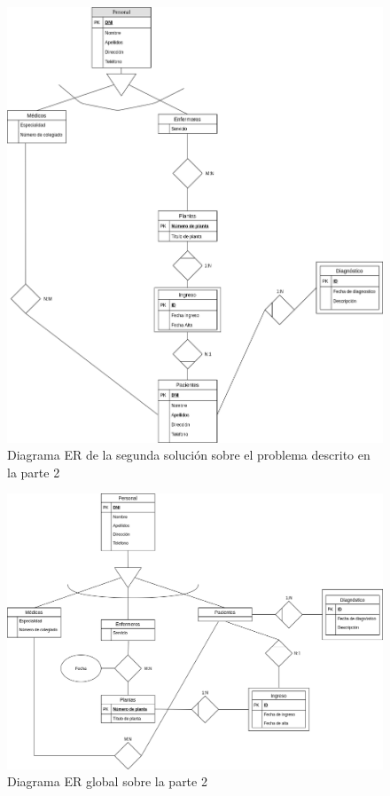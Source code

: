 \documentclass{article}
\begin{document}
\begin{figure}
\centering
\includegraphics[scale=0.5]{images/er_parte2_2.png}
\caption{Diagrama ER de la segunda solución sobre el problema descrito en la parte 2}
\label{fig:er_parte2_2}
\end{figure}

\begin{landscape}
\begin{figure}
\centering
\includegraphics[scale=0.45]{images/global_parte2_practica3.png}
\caption{Diagrama ER global sobre la parte 2}
\label{fig:er_parte2_global}
\end{figure}
\end{landscape}
\end{document}
